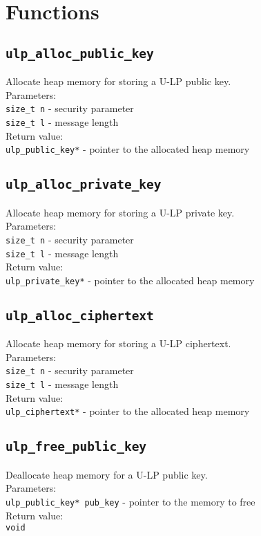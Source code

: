 \documentclass[10pt,a4paper]{article}
\begin{document}
\section*{Functions}

\subsection*{\texttt{ulp\_alloc\_public\_key}}
Allocate heap memory for storing a U-LP public key.\\
Parameters:\\
\texttt{size\_t n} - security parameter\\
\texttt{size\_t l} - message length\\
Return value:\\
\texttt{ulp\_public\_key*} - pointer to the allocated heap memory

\subsection*{\texttt{ulp\_alloc\_private\_key}}
Allocate heap memory for storing a U-LP private key.\\
Parameters:\\
\texttt{size\_t n} - security parameter\\
\texttt{size\_t l} - message length\\
Return value:\\
\texttt{ulp\_private\_key*} - pointer to the allocated heap memory

\subsection*{\texttt{ulp\_alloc\_ciphertext}}
Allocate heap memory for storing a U-LP ciphertext.\\
Parameters:\\
\texttt{size\_t n} - security parameter\\
\texttt{size\_t l} - message length\\
Return value:\\
\texttt{ulp\_ciphertext*} - pointer to the allocated heap memory

\subsection*{\texttt{ulp\_free\_public\_key}}
Deallocate heap memory for a U-LP public key.\\
Parameters:\\
\texttt{ulp\_public\_key* pub\_key} - pointer to the memory to free\\
Return value:\\
\texttt{void}
\end{document}
